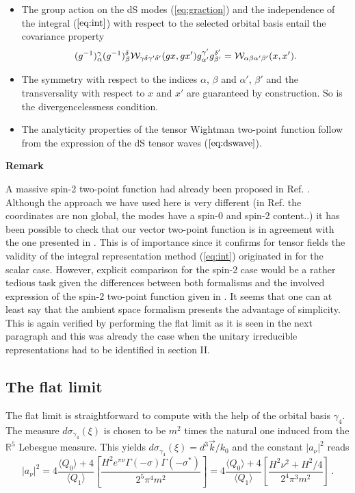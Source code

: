\documentclass[a4paper,11pt,showpacs,preprintnumbers]{revtex4}
\def\setR{\mathbb{R}}
\begin{document}
\begin{itemize}
\item The group action on the dS modes (\ref{eq:graction})
and the independence of the integral  ($\ref{eq:int}$) with
respect to the selected orbital basis  entail the covariance
property
\begin{equation}
(g^{-1})^{\gamma}_{\alpha}(g^{-1})^{\delta}_{\beta} {\cal
W}_{\gamma\delta \gamma'\delta'} (g x,g x')g^{\gamma'}_{\alpha'}
g^{\delta'}_{\beta'}= {\cal W}_{\alpha\beta \alpha'\beta'}(x,x') .
\end{equation}
\item The symmetry with respect to the indices $\alpha$, $\beta$
and $\alpha'$, $\beta'$ and the transversality with respect to $x$
and $x'$ are guaranteed by construction. So is the divergencelessness
condition.
\item The analyticity properties of the tensor Wightman two-point
function follow from the expression of the dS tensor waves
($\ref{eq:dswave}$).
\end{itemize}
{\bf Remark}

A massive spin-2 two-point function had already been proposed in
Ref. \cite{gasp}. Although the approach we have used here is very
different (in Ref. \cite{gasp} the coordinates are non global, the
modes have a spin-0 and spin-2 content..) it has been possible to
check that our vector two-point function is in agreement with the
one presented in \cite{gasp}. This is of importance since it
confirms for tensor fields the validity of the integral
representation method (\ref{eq:int}) originated in \cite{brmo} for
the scalar case. However, explicit  comparison for the spin-2 case
would be a rather tedious task given the differences between both
formalisms and the involved expression of the spin-2 two-point
function given in \cite{gasp}. It seems that one can at least say
that the ambient space formalism presents the advantage of
simplicity. This is again verified by performing the flat limit as
it is seen in the next paragraph and this was already the case
when the unitary irreducible representations had to be identified
in section II.


\subsection{The flat limit}
The flat limit is straightforward to compute with  the help of the
orbital basis $\gamma_{4}$. The measure
$d\sigma_{\gamma_{4}}(\xi)$  is chosen to be  $m^2$ times the
natural one induced from the $\setR^{5}$ Lebesgue measure. This
yields $d\sigma_{\gamma_4}(\xi)=d^{3}\vec{k}/k_{0}$ and the
constant $\vert a_{\nu}\vert^{2}$ reads
\begin{equation}
\vert a_{\nu}\vert^{2}=4\frac{\langle Q_0 \rangle+4 }{\langle Q_1
\rangle}\left[ \frac{H^2 e^{\pi\nu}\Gamma(-\sigma)
\Gamma(-\sigma^{*})}{2^5\pi^4m^2}\right]=4\frac{\langle Q_0
\rangle+4 }{\langle Q_1 \rangle}\left[
\frac{H^2\nu^{2}+H^{2}/4}{2^4\pi^3m^2}\right]\,.
\end{equation}
\end{document}
